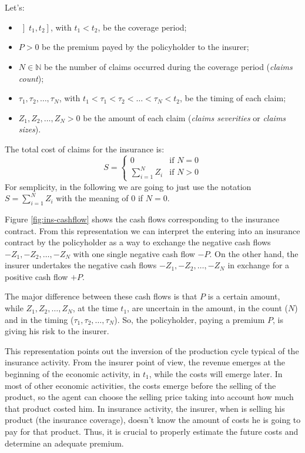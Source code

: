 \documentclass[a4paper, nobind]{templates/ociamthesis}
\providecommand{\tightlist}{%
  \setlength{\itemsep}{0pt}\setlength{\parskip}{0pt}}
\theoremstyle{definition}
\theoremstyle{definition}
\theoremstyle{definition}
\theoremstyle{remark}
\begin{document}
Let's:

\begin{itemize}
\tightlist
\item
  \(\left]t_1, t_2\right]\), with \(t_1<t_2\), be the coverage period;
\item
  \(P>0\) be the premium payed by the policyholder to the insurer;
\item
  \(N\in\mathbb{N}\) be the number of claims occurred during the coverage period (\emph{claims count});
\item
  \(\tau_1, \tau_2, \dots, \tau_N\), with \(t_1<\tau_1< \tau_2 < \dots < \tau_N<t_2\), be the timing of each claim;
\item
  \(Z_1, Z_2, \dots, Z_N > 0\) be the amount of each claim (\emph{claims severities} or \emph{claims sizes}).
\end{itemize}

The total cost of claims for the insurance is:
\[
S = 
\begin{cases}
  0                    & \text{if } N=0 \\
  \sum_{i=1}^{N}{Z_i}  & \text{if } N>0
\end{cases}
\]
For semplicity, in the following we are going to just use the notation \(S = \sum_{i=1}^{N}{Z_i}\) with the meaning of \(0\) if \(N=0\).

Figure \ref{fig:ins-cashflow} shows the cash flows corresponding to the insurance contract. From this representation we can interpret the entering into an insurance contract by the policyholder as a way to exchange the negative cash flows \(-Z_1, -Z_2, \dots, -Z_N\) with one single negative cash flow \(-P\). On the other hand, the insurer undertakes the negative cash flows \(-Z_1, -Z_2, \dots, -Z_N\) in exchange for a positive cash flow \(+P\).

The major difference between these cash flows is that \(P\) is a certain amount, while \(Z_1, Z_2, \dots, Z_N\), at the time \(t_1\), are uncertain in the amount, in the count (\(N\)) and in the timing (\(\tau_1, \tau_2, \dots, \tau_N\)). So, the policyholder, paying a premium \(P\), is giving his risk to the insurer.

This representation points out the inversion of the production cycle typical of the insurance activity. From the insurer point of view, the revenue emerges at the beginning of the economic activity, in \(t_1\), while the costs will emerge later. In most of other economic activities, the costs emerge before the selling of the product, so the agent can choose the selling price taking into account how much that product costed him. In insurance activity, the insurer, when is selling his product (the insurance coverage), doesn't know the amount of costs he is going to pay for that product. Thus, it is crucial to properly estimate the future costs and determine an adequate premium.
\end{document}
